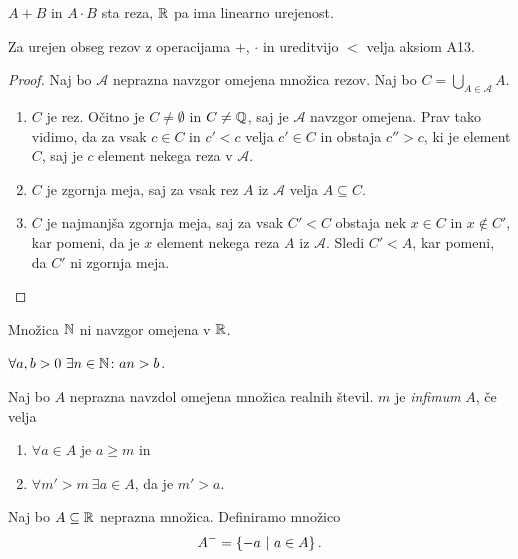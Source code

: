 \documentclass[12pt, a4paper]{article}
\begin{document}
\begin{opomba}
$A+B$ in $A\cdot B$ sta reza, $\mathbb{R}$ pa ima linearno urejenost.
\end{opomba}

\begin{izrek}
Za urejen obseg rezov z operacijama $+$, $\cdot$ in ureditvijo $<$ velja aksiom A13.
\end{izrek}

\begin{proof}
Naj bo $\mathcal{A}$ neprazna navzgor omejena množica rezov. Naj bo $\displaystyle C=\bigcup_{A\in\mathcal{A}}A.$

\begin{enumerate}[label=\arabic*)]
\item $C$ je rez. Očitno je $C\ne \emptyset$ in $C\ne\mathbb{Q}$, saj je $\mathcal{A}$ navzgor omejena. Prav tako vidimo, da za vsak $c\in C$ in $c'<c$ velja $c'\in C$ in obstaja  $c''>c$, ki je element $C$, saj je $c$ element nekega reza v $\mathcal{A}$.
\item $C$ je zgornja meja, saj za vsak rez $A$ iz $\mathcal{A}$  velja $A\subseteq C$.
\item $C$ je najmanjša zgornja meja, saj za vsak $C'<C$ obstaja nek $x\in C$ in $x\not\in C'$, kar pomeni, da je $x$ element nekega reza $A$ iz $\mathcal{A}$. Sledi $C'<A$, kar pomeni, da $C'$ ni zgornja meja.\qedhere
\end{enumerate}
\end{proof}

\begin{posledica}
Množica $\mathbb{N}$ ni navzgor omejena v $\mathbb{R}$.
\end{posledica}

\begin{trditev}
$\forall a,b>0~\exists n\in\mathbb{N}\colon an>b$.
\end{trditev}

\begin{definicija}
Naj bo $A$ neprazna navzdol omejena množica realnih števil. $m$ je \emph{infimum} $A$, če velja

\begin{enumerate}[label=\arabic*)]
\item $\forall a\in A$ je $a\geq m$ in
\item $\forall m'>m~\exists a\in A$, da je $m'>a$.
\end{enumerate}
\end{definicija}

\begin{definicija}
Naj bo $A\subseteq\mathbb{R}$ neprazna množica. Definiramo množico
\[
A^-=\left\{-a~\middle\vert~a\in A\right\}.
\]
\end{definicija}
\end{document}
